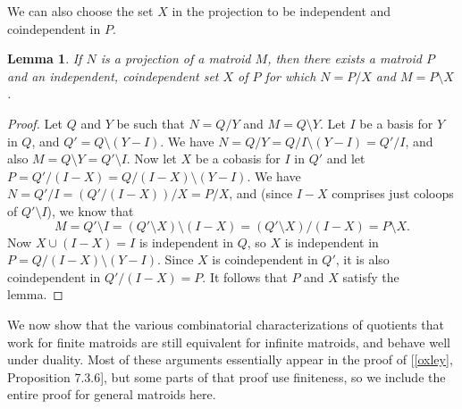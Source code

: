 \documentclass{amsart}
\theoremstyle{plain}
\newtheorem{lemma}[theorem]{Lemma}
\theoremstyle{definition}
\newcommand{\del}{\!\setminus\!}
\newcommand{\con}{/}
\begin{document}
We can also choose the set $X$ in the projection to be independent and coindependent in $P$. 

\begin{lemma}\label{indepprojection}
  If $N$ is a projection of a matroid $M$, then there exists a matroid $P$ and an independent, coindependent set $X$
  of $P$ for which $N = P \con X$ and $M = P \del X$. 
\end{lemma}
\begin{proof}
  Let $Q$ and $Y$ be such that $N = Q \con Y$ and $M = Q \del Y$. Let $I$ be a basis for $Y$ in $Q$,
  and $Q' = Q \del (Y - I)$. We have $N = Q \con Y = Q \con I \del (Y - I) = Q' \con I$, 
  and also $M = Q \del Y = Q' \del I$. 
  Now let $X$ be a cobasis for $I$ in $Q'$ and let $P = Q' \con (I-X) = Q \con (I - X) \del (Y - I)$. We have
  $N = Q' \con I = (Q' \con (I-X)) \con X = P \con X$, 
  and (since $I-X$ comprises just coloops of $Q' \del I$), 
  we know that 
  \[M = Q' \del I = (Q' \del X) \del (I - X) = (Q' \del X) \con (I - X) = P \del X.\] 
  Now $X \cup (I - X) = I$ is independent in $Q$, so $X$ is independent in $P = Q \con (I - X) \del (Y - I)$. 
  Since $X$ is coindependent in $Q'$, it is also coindependent in $Q' \con (I-X) = P$. 
  It follows that $P$ and $X$ satisfy the lemma. 
\end{proof}

We now show that the various combinatorial characterizations of quotients that work 
for finite matroids are still equivalent for infinite matroids, and behave well under duality.
Most of these arguments essentially appear in the proof of [\ref{oxley}, Proposition 7.3.6], 
but some parts of that proof use finiteness, so we include the entire proof for general matroids here.
\end{document}
